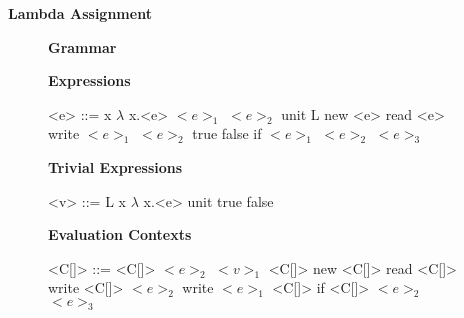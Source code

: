 \documentclass[11pt,oneside]{book}
\begin{document}
\frontmatter

\mainmatter

\pagebreak

\begin{center}
    {
        \bf
        \huge
        Lambda Assignment
    }
\end{center}

\begin{figure}[!hp]
\begin{center}
{
    \bf
    \huge
    Grammar
}
\end{center}


\setlength{\grammarindent}{10em} %

\setlength{\grammarparsep}{5pt} %

\textbf{Expressions}

\begin{grammar}

    <e> ::=  x
        \alt $\lambda$ x.<e>
        \alt $<e>_1$ $<e>_2$
        \alt unit
        \alt L
        \alt new <e>
        \alt read <e>
        \alt write $<e>_1$ $<e>_2$
        \alt true
        \alt false
        \alt if $<e>_1$ $<e>_2$ $<e>_3$

\end{grammar}

\textbf{Trivial Expressions}

\begin{grammar}

    <v> ::=  L
        \alt x
        \alt $\lambda$ x.<e>
        \alt unit
        \alt true
        \alt false

\end{grammar}

\textbf{Evaluation Contexts}

\begin{grammar}

    <C[\textbullet]> ::=  \textbullet
                     \alt <C[\textbullet]> $<e>_2$
                     \alt $<v>_1$ <C[\textbullet]>
                     \alt new <C[\textbullet]>
                     \alt read <C[\textbullet]>
                     \alt write <C[\textbullet]> $<e>_2$
                     \alt write $<e>_1$ <C[\textbullet]>
                     \alt if <C[\textbullet]> $<e>_2$ $<e>_3$

\end{grammar}

\end{figure}
\end{document}
